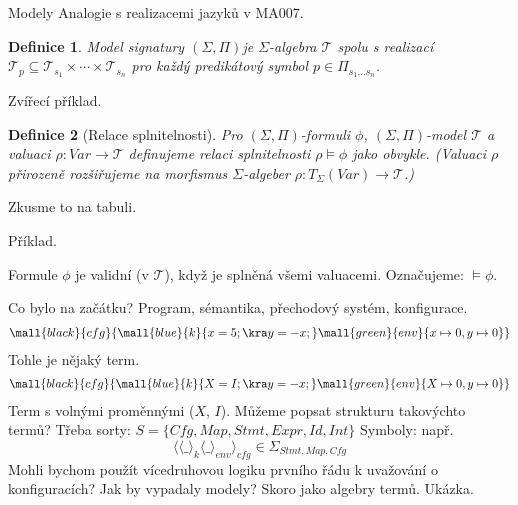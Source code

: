 \documentclass[11pt]{beamer}
\newtheorem{dfn}{Definice}
\newtheorem{pozn}{Poznámka}
\newcommand{\Var}{\mathit{Var}}
\newcommand{\folSignature}{\ensuremath{\left( \Sigma, \Pi \right)}}
\begin{document}
\begin{frame}{Modely}
Analogie s realizacemi jazyků v MA007.
\begin{dfn}
Model signatury \folSignature je $\Sigma$-algebra $\mathcal{T}$ spolu s realizací $\mathcal{T}_p \subseteq \mathcal{T}_{s_1} \times \cdots \times \mathcal{T}_{s_n} $ pro každý predikátový symbol $p \in \Pi_{s_1 \ldots s_n}$.
\end{dfn}

\pause
Zvířecí příklad.
\pause

\begin{dfn}[Relace splnitelnosti]
Pro \folSignature -formuli $\phi$, \folSignature -model $\mathcal{T}$ a valuaci $\rho : \Var \rightarrow \mathcal{T}$ definujeme relaci splnitelnosti $\rho \models \phi$ jako obvykle. (Valuaci $\rho$ přirozeně rozšiřujeme na morfismus $\Sigma$-algeber $\rho : T_{\Sigma}\left( Var \right) \rightarrow \mathcal{T}$.)
\end{dfn}
\pause

Zkusme to na tabuli.

\pause

Příklad.

\pause

Formule $\phi$ je validní (v $\mathcal{T}$), když je splněná všemi valuacemi. Označujeme: $\models \phi$.

%
%

\end{frame}
%

\begin{frame}
Co bylo na začátku? \pause Program, sémantika, přechodový systém, konfigurace.
\pause
\begin{multline*}
\mall{black}{cfg}{\mall{blue}{k}{x=5; \kra y=-x; } \mall{green}{env}{x \mapsto 0,y \mapsto 0}}
\end{multline*}
\pause
Tohle je nějaký term.
\pause
\begin{multline*}
\mall{black}{cfg}{\mall{blue}{k}{X=I; \kra y=-x; } \mall{green}{env}{X \mapsto 0,y \mapsto 0}}
\end{multline*}
\pause
Term s volnými proměnnými ($X$, $I$).
\pause
Můžeme popsat strukturu takovýchto termů?
\pause
Třeba sorty:
$S = \lbrace \mathit{Cfg} , \mathit{Map}, \mathit{Stmt}, \mathit{Expr}, \mathit{Id}, \mathit{Int} \rbrace $
\pause
Symboly:
\pause
např. 
\begin{equation*}
\langle \langle \_ \rangle_{k} \langle \_ \rangle_{env} \rangle_{cfg} \in \Sigma_{\mathit{Stmt}, \mathit{Map}, \mathit{Cfg} }
\end{equation*}
\pause
Mohli bychom použít vícedruhovou logiku prvního řádu k uvažování o konfiguracích?
\pause
Jak by vypadaly modely?
\pause
Skoro jako algebry termů. Ukázka.

\end{frame}
\end{document}
